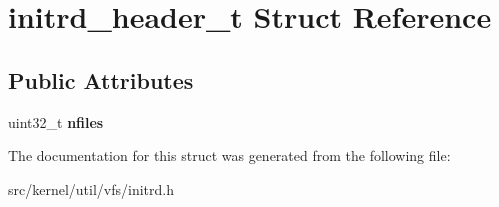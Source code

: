 \hypertarget{structinitrd__header__t}{}\section{initrd\+\_\+header\+\_\+t Struct Reference}
\label{structinitrd__header__t}
\subsection*{Public Attributes}
\begin{DoxyCompactItemize}
\item 
\mbox{\label{structinitrd__header__t_a2e2fd2fb49ad436c5b01439cb5c491d5}} 
uint32\+\_\+t {\bfseries nfiles}
\end{DoxyCompactItemize}


The documentation for this struct was generated from the following file\+:\begin{DoxyCompactItemize}
\item 
src/kernel/util/vfs/initrd.\+h\end{DoxyCompactItemize}
